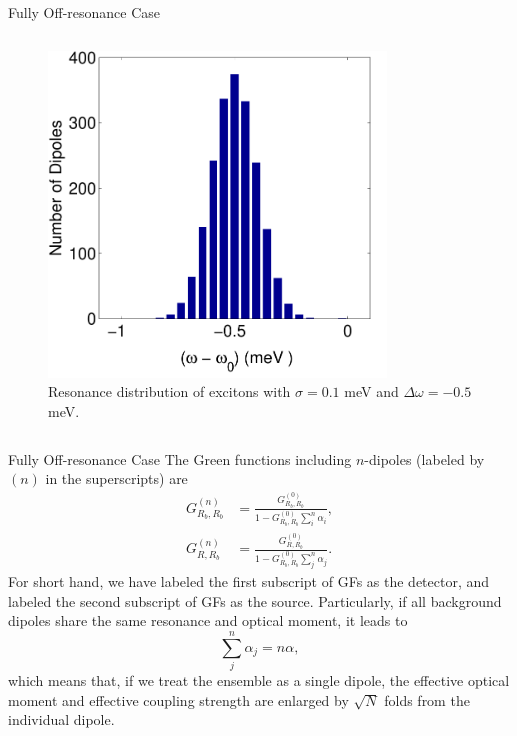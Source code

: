 \documentclass{beamer}
\begin{document}
\begin{frame}{Fully Off-resonance Case}
\begin{columns}
\begin{figure}[htp]%
\centering
\begin{center}
\includegraphics[width=0.8\textwidth]{./Figs/distr_wd0dot5s0dot1}
\end{center}
\caption[off-resonance case.]{\fontsize{8}{-0.2}\selectfont Resonance distribution of excitons with $\sigma=0.1$ meV and $\Delta\omega=-0.5$ meV.}
\label{distr_offresonance1}
\end{figure}
\end{columns}
\end{frame}

\begin{frame}{Fully Off-resonance Case}
\fontsize{8}{-0.2}\selectfont
The Green functions including $n$-dipoles (labeled by $(n)$ in the superscripts) are
\begin{align}
\label{Gn11}
 G^{(n)}_{R_b,R_b}&=\frac{G^{(0)}_{R_b,R_b}}{1-G^{(0)}_{R_b,R_b}\sum_i^n{\alpha_i}},\\
\label{GnR1}
 G^{(n)}_{R,R_b}&=\frac{G^{(0)}_{R,R_b}}{1-G^{(0)}_{R_b,R_b}\sum_j^n{\alpha_j}}.
\end{align}
For short hand, we have labeled the first subscript of GFs as the detector,
and labeled the second subscript of GFs as the source.
\vskip10pt
Particularly, if all background dipoles share the same resonance and optical moment, it leads to
\begin{equation}
\sum_j^n{\alpha_j}=n\alpha,
\end{equation}
which means that, if we treat the ensemble as a single dipole, the effective optical moment and effective coupling strength are enlarged by $\sqrt{N}$ folds from the individual dipole. 
\end{frame}
\end{document}
